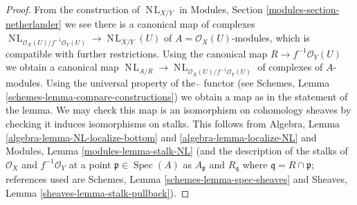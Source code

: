 \documentclass[10pt,a4paper]{amsart}
\theoremstyle{plain}
\theoremstyle{definition}
\theoremstyle{remark}
\numberwithin{equation}{subsection}
\def\Spec{\mathop{\mathrm{Spec}}}
\def\NL{\mathop{N\!L}\nolimits}
\begin{document}
\begin{proof}
From the construction of $\NL_{X/Y}$ in
Modules, Section \ref{modules-section-netherlander}
we see there is a canonical map of complexes
$\NL_{\mathcal{O}_X(U)/f^{-1}\mathcal{O}_Y(U)} \to \NL_{X/Y}(U)$
of $A = \mathcal{O}_X(U)$-modules, which is compatible
with further restrictions. Using the canonical map
$R \to f^{-1}\mathcal{O}_Y(U)$ we obtain a canonical map
$\NL_{A/R} \to \NL_{\mathcal{O}_X(U)/f^{-1}\mathcal{O}_Y(U)}$
of complexes of $A$-modules.
Using the universal property of the $\widetilde{\ }$
functor (see Schemes, Lemma \ref{schemes-lemma-compare-constructions})
we obtain a map as in the statement of the lemma.
We may check this map is an isomorphism on cohomology sheaves
by checking it induces isomorphisms on stalks.
This follows from
Algebra, Lemma \ref{algebra-lemma-NL-localize-bottom} and
\ref{algebra-lemma-localize-NL}
and
Modules, Lemma \ref{modules-lemma-stalk-NL}
(and the description of the stalks of
$\mathcal{O}_X$ and $f^{-1}\mathcal{O}_Y$
at a point $\mathfrak p \in \Spec(A)$ as $A_\mathfrak p$ and
$R_\mathfrak q$ where $\mathfrak q = R \cap \mathfrak p$; references
used are Schemes, Lemma \ref{schemes-lemma-spec-sheaves}
and
Sheaves, Lemma \ref{sheaves-lemma-stalk-pullback}).
\end{proof}
\end{document}
